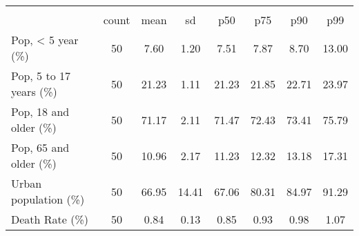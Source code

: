 {
\def\sym#1{\ifmmode^{#1}\else\(^{#1}\)\fi}
\begin{tabular}{l*{1}{ccccccc}}
\hline\hline
                    &\multicolumn{7}{c}{}                                                                      \\
                    &       count&        mean&          sd&         p50&         p75&         p90&         p99\\
\hline
Pop, < 5 year (\%)  &          50&        7.60&        1.20&        7.51&        7.87&        8.70&       13.00\\
Pop, 5 to 17 years (\%)&          50&       21.23&        1.11&       21.23&       21.85&       22.71&       23.97\\
Pop, 18 and older (\%)&          50&       71.17&        2.11&       71.47&       72.43&       73.41&       75.79\\
Pop, 65 and older (\%)&          50&       10.96&        2.17&       11.23&       12.32&       13.18&       17.31\\
Urban population (\%)&          50&       66.95&       14.41&       67.06&       80.31&       84.97&       91.29\\
Death Rate (\%)     &          50&        0.84&        0.13&        0.85&        0.93&        0.98&        1.07\\
\hline\hline
\end{tabular}
}
